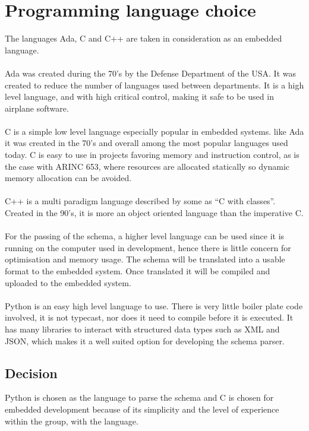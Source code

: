 \section{Programming language choice}
The languages Ada, C and C++ are taken in consideration as an embedded language.
\\\\
Ada was created during the 70's by the Defense Department of the USA.
It was created to reduce the number of
languages used between departments.
It is a high level language,
and with high critical control,
making it safe to be used in airplane software.
\\\\
C is a simple low level language especially popular in embedded systems.
like Ada it was created in the 70's and
overall among the most popular languages used today.
C is easy to use in projects favoring memory and instruction control,
as is the case with ARINC 653,
where resources are allocated statically
so dynamic memory allocation can be avoided.
\\\\
C++ is a multi paradigm language described by some as ``C with classes''.
Created in the 90's, it is more an object oriented language than
the imperative C.
\\\\
For the passing of the schema, a higher level language can be used
since it is running on the computer used in development,
hence there is little concern for optimisation and memory usage.
The schema will be translated into a usable format to the embedded system.
Once translated it will be compiled and uploaded to the
embedded system.
\\\\
Python is an easy high level language to use.
There is very little boiler plate code involved,
it is not typecast, nor does it need to compile
before it is executed.
It has many libraries to interact with structured
data types such as XML and JSON,
which makes it a well suited option for developing the schema parser.

\subsection{Decision}
Python is chosen as the language to parse the schema and
C is chosen for embedded development because of its simplicity and
the level of experience within the group, with the language.
